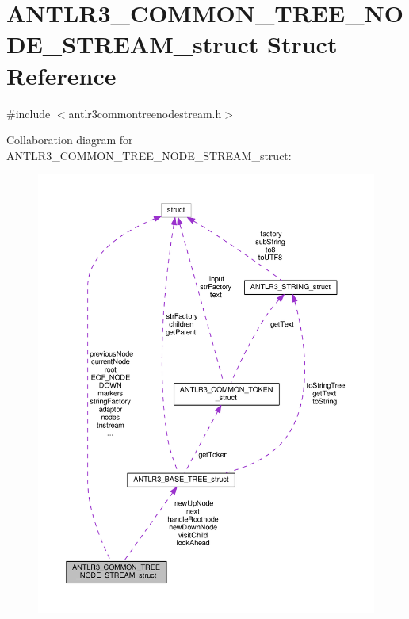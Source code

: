 \hypertarget{struct_a_n_t_l_r3___c_o_m_m_o_n___t_r_e_e___n_o_d_e___s_t_r_e_a_m__struct}{\section{A\-N\-T\-L\-R3\-\_\-\-C\-O\-M\-M\-O\-N\-\_\-\-T\-R\-E\-E\-\_\-\-N\-O\-D\-E\-\_\-\-S\-T\-R\-E\-A\-M\-\_\-struct Struct Reference}
\label{struct_a_n_t_l_r3___c_o_m_m_o_n___t_r_e_e___n_o_d_e___s_t_r_e_a_m__struct}
}


{\ttfamily \#include $<$antlr3commontreenodestream.\-h$>$}



Collaboration diagram for A\-N\-T\-L\-R3\-\_\-\-C\-O\-M\-M\-O\-N\-\_\-\-T\-R\-E\-E\-\_\-\-N\-O\-D\-E\-\_\-\-S\-T\-R\-E\-A\-M\-\_\-struct\-:
\nopagebreak
\begin{figure}[H]
\begin{center}
\leavevmode
\includegraphics[width=350pt]{struct_a_n_t_l_r3___c_o_m_m_o_n___t_r_e_e___n_o_d_e___s_t_r_e_a_m__struct__coll__graph}
\end{center}
\end{figure}
